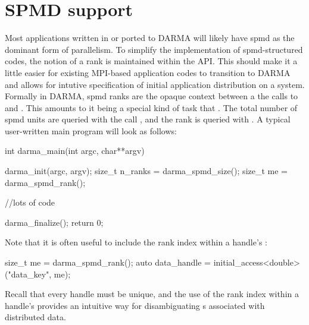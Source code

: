 
\section{SPMD support}
\label{sec:spmd}
Most applications written in or ported to DARMA will likely have \gls{spmd} as
the dominant form of parallelism.
To simplify the implementation of \gls{spmd}-structured codes, the notion of 
a \gls{rank} is maintained within the \gls{API}.   
This should make it a little easier for existing MPI-based application codes to transition 
to DARMA and allows for intutive specification of initial application
distribution on a system.
Formally in DARMA, \gls{spmd} \glspl{rank} are the \gls{opaque context}
between a the calls to  and .
This amounts to it being a special kind of task that .   
The total number of \gls{spmd} units are queried with the call ,
and the \gls{rank} is queried with . A typical user-written main program will look as follows:
\begin{CppCode}
int darma_main(int argc, char**argv){

	darma_init(argc, argv);
	size_t n_ranks = darma_spmd_size();
	size_t me = darma_spmd_rank();

	//lots of code

	darma_finalize();
  return 0;
}
\end{CppCode}

Note that it is often useful to include the \gls{rank} index within a 
\gls{handle}'s :  
\begin{CppCode}
size_t me = darma_spmd_rank();
auto data_handle = initial_access<double>("data_key", me);
\end{CppCode}  
Recall that every \gls{handle}  must be unique, and the 
 use of the \gls{rank} index within a \gls{handle}'s  provides an
 intuitive way for disambiguating s associated with distributed
 data.  

